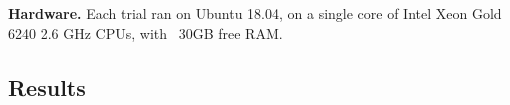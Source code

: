 \noindent \textbf{Hardware.} Each trial ran on Ubuntu 18.04, on a single core
of Intel Xeon Gold 6240 2.6 GHz CPUs, with ~30GB free RAM.


 
\subsection{Results}
\label{exp-results}


